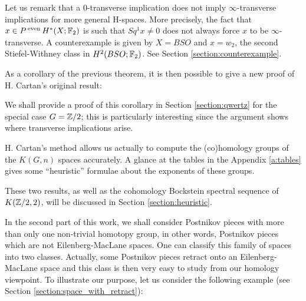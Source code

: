 Let us remark that a $0$-transverse implication does not imply $\infty$-transverse implications for more general H-spaces. More precisely, the fact that $x\in P\operatorname{^{even}} H^*(X;\mathbb{F}_2)$ is such that $Sq^1x\not=0$ does not always force $x$ to be $\infty$-transverse. A counterexample is given by $X=BSO$ and $x=w_2$, the second Stiefel-Withney class in $H^2(BSO;\mathbb{F}_2)$. See Section \ref{section:counterexample}.

As a corollary of the previous theorem, it is then possible to give a new proof of H. Cartan's original result:

\begin{cor}\label{c:no exponent for Eilenberg-MacLane spaces}
\label{cor_Cartan_result}

\end{cor}
\theoremstyle{plain}
\newtheorem*{cor_Cartan_result}{\mbox{\ref{cor_Cartan_result}.~Corollary}}

We shall provide a proof of this corollary in Section \ref{section:qwertz} for the special case $G=\mathbb{Z}/2$; this is particularly interesting since the argument shows where transverse implications arise.

\bigskip
H. Cartan's method allows us actually to compute the (co)homology groups of the $K(G,n)$ spaces accurately. A glance at the tables in the Appendix \ref{a:tables} gives some ``heuristic'' formulae about the exponents of these groups. 

\begin{prop}\label{p:homology exponent for K(Z/2,2)}
\label{prop_heuristic_H}

\end{prop}
\theoremstyle{plain}
\newtheorem*{prop_heuristic_H}{\mbox{\ref{prop_heuristic_H}.~Proposition}}

\begin{prop}\label{p:cohomology exponent for K(Z/2,2)}
\label{prop_heuristic_coH}

\end{prop}
\theoremstyle{plain}
\newtheorem*{prop_heuristic_coH}{\mbox{\ref{prop_heuristic_coH}.~Proposition}}

These two results, as well as the cohomology Bockstein spectral sequence of $K(\mathbb{Z}/2,2)$, will be discussed in Section \ref{section:heuristic}.

\newpage
In the second part of this work, we shall consider Postnikov pieces with more than only one non-trivial homotopy group, in other words, Postnikov pieces which are not Eilenberg-MacLane spaces. One can classify this family of spaces into two classes. Actually, some Postnikov pieces retract onto an Eilenberg-MacLane space and this class is then very easy to study from our homology viewpoint. To illustrate our purpose, let us consider the following example (see Section \ref{section:space_with_retract}):


